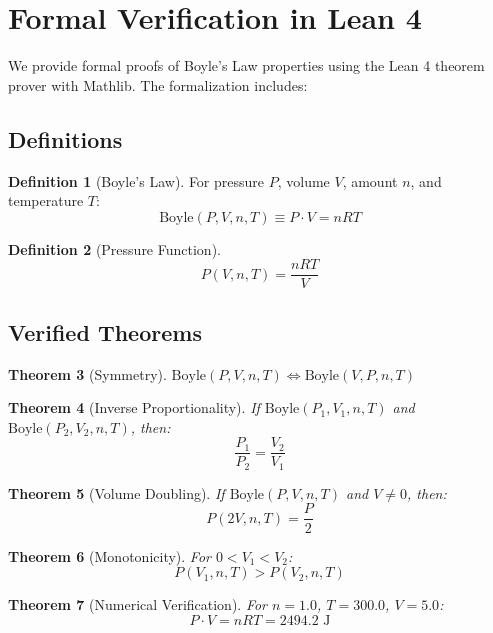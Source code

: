 \documentclass{article}
\theoremstyle{plain}
\newtheorem{theorem}{Theorem}[section]
\theoremstyle{definition}
\newtheorem{definition}[theorem]{Definition}
\theoremstyle{remark}
\begin{document}
\section{Formal Verification in Lean 4}

We provide formal proofs of Boyle's Law properties using the Lean 4 theorem prover with Mathlib. The formalization includes:

\subsection{Definitions}

\begin{definition}[Boyle's Law]
  For pressure $P$, volume $V$, amount $n$, and temperature $T$:
  \[
    \text{Boyle}(P, V, n, T) \equiv P \cdot V = nRT
  \]
\end{definition}

\begin{definition}[Pressure Function]
  \[
    P(V, n, T) = \frac{nRT}{V}
  \]
\end{definition}

\subsection{Verified Theorems}

\begin{theorem}[Symmetry]
  \label{thm:symmetry}
  $\text{Boyle}(P, V, n, T) \iff \text{Boyle}(V, P, n, T)$
\end{theorem}

\begin{theorem}[Inverse Proportionality]
  \label{thm:inverse}
  If $\text{Boyle}(P_1, V_1, n, T)$ and $\text{Boyle}(P_2, V_2, n, T)$, then:
  \[
    \frac{P_1}{P_2} = \frac{V_2}{V_1}
  \]
\end{theorem}

\begin{theorem}[Volume Doubling]
  \label{thm:doubling}
  If $\text{Boyle}(P, V, n, T)$ and $V \neq 0$, then:
  \[
    P(2V, n, T) = \frac{P}{2}
  \]
\end{theorem}

\begin{theorem}[Monotonicity]
  \label{thm:monotonicity}
  For $0 < V_1 < V_2$:
  \[
    P(V_1, n, T) > P(V_2, n, T)
  \]
\end{theorem}

\begin{theorem}[Numerical Verification]
  \label{thm:numerical}
  For $n = 1.0$, $T = 300.0$, $V = 5.0$:
  \[
    P \cdot V = nRT = 2494.2 \text{ J}
  \]
\end{theorem}
\end{document}
